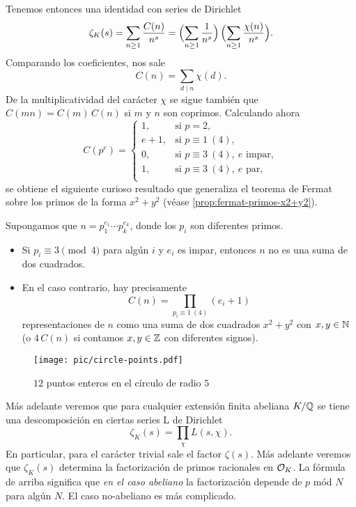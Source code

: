 Tenemos entonces una identidad con series de Dirichlet
\[ \zeta_K (s) = \sum_{n\ge 1} \frac{C (n)}{n^s} =
\Bigl(\sum_{n\ge 1} \frac{1}{n^s}\Bigr)\,\Bigl(\sum_{n\ge 1} \frac{\chi (n)}{n^s}\Bigr). \]
Comparando los coeficientes, nos sale
$$C (n) = \sum_{d \mid n} \chi (d).$$
De la multiplicatividad del carácter $\chi$ se sigue también que
$C (mn) = C (m)\,C (n)$ si $m$ y $n$ son coprimos. Calculando ahora
\[ C (p^e) = \begin{cases}
  1, & \text{si } p = 2,\\
  e+1, & \text{si } p \equiv 1~(4),\\
  0, & \text{si } p \equiv 3~(4), ~ e\text{ impar},\\
  1, & \text{si } p \equiv 3~(4), ~ e\text{ par},\\
\end{cases} \]
se obtiene el siguiente curioso resultado que generaliza el teorema
de Fermat sobre los primos de la forma $x^2 + y^2$
(véase \ref{prop:fermat-primos-x2+y2}).

\begin{teorema}
  \label{thm:n-x2-y2}
  Supongamos que $n = p_1^{e_1}\cdots p_k^{e_k}$, donde los $p_i$ son diferentes
  primos.
  \begin{itemize}
  \item Si $p_i \equiv 3 \pmod{4}$ para algún $i$ y $e_i$ es impar, entonces
    $n$ no es una suma de dos cuadrados.

  \item En el caso contrario, hay precisamente
    $$C (n) = \prod_{p_i \equiv 1~(4)} (e_i + 1)$$
    representaciones de $n$ como una suma de dos cuadrados $x^2 + y^2$ con
    $x,y \in \mathbb{N}$ (o $4\,C(n)$ si contamos $x,y\in \mathbb{Z}$ con diferentes signos).
  \end{itemize}
\end{teorema}

\begin{figure}
  \begin{center}
    \texttt{[image: pic/circle-points.pdf]}
  \end{center}

  \caption{$12$ puntos enteros en el círculo de radio $5$}
\end{figure}

\begin{comentario}
  Más adelante veremos que para cualquier extensión finita abeliana $K/\mathbb{Q}$ se
  tiene una descomposición en ciertas series L de Dirichlet
  $$\zeta_K (s) = \prod_\chi L (s,\chi).$$
  En particular, para el carácter trivial sale el factor $\zeta (s)$.
  Más adelante veremos que $\zeta_K (s)$ determina la factorización de primos
  racionales en $\mathcal{O}_K$. La fórmula de arriba significa que
  \emph{en el caso abeliano} la factorización depende de $p$ mód $N$ para algún
  $N$. El caso no-abeliano es más complicado.
\end{comentario}


